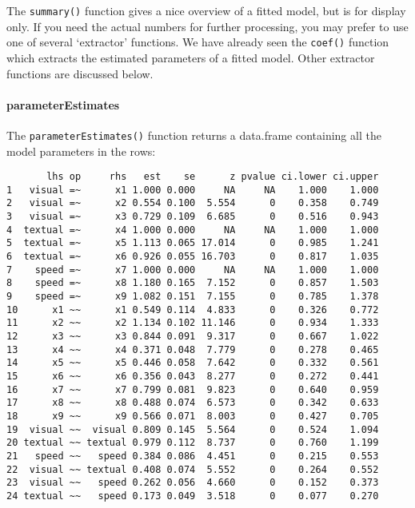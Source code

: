 The \texttt{summary()} function gives a nice overview of a fitted model,
but is for display only. If you need the actual numbers for further
processing, you may prefer to use one of several `extractor' functions.
We have already seen the \texttt{coef()} function which extracts the
estimated parameters of a fitted model. Other extractor functions are
discussed below.

\hypertarget{parameterestimates}{%
\paragraph{parameterEstimates}\label{parameterestimates}}

The \texttt{parameterEstimates()} function returns a data.frame
containing all the model parameters in the rows:

\begin{Shaded}
\begin{Highlighting}[]
\OtherTok{\textless{}{-}} 
\end{Highlighting}
\end{Shaded}

\begin{verbatim}
       lhs op     rhs   est    se      z pvalue ci.lower ci.upper
1   visual =~      x1 1.000 0.000     NA     NA    1.000    1.000
2   visual =~      x2 0.554 0.100  5.554      0    0.358    0.749
3   visual =~      x3 0.729 0.109  6.685      0    0.516    0.943
4  textual =~      x4 1.000 0.000     NA     NA    1.000    1.000
5  textual =~      x5 1.113 0.065 17.014      0    0.985    1.241
6  textual =~      x6 0.926 0.055 16.703      0    0.817    1.035
7    speed =~      x7 1.000 0.000     NA     NA    1.000    1.000
8    speed =~      x8 1.180 0.165  7.152      0    0.857    1.503
9    speed =~      x9 1.082 0.151  7.155      0    0.785    1.378
10      x1 ~~      x1 0.549 0.114  4.833      0    0.326    0.772
11      x2 ~~      x2 1.134 0.102 11.146      0    0.934    1.333
12      x3 ~~      x3 0.844 0.091  9.317      0    0.667    1.022
13      x4 ~~      x4 0.371 0.048  7.779      0    0.278    0.465
14      x5 ~~      x5 0.446 0.058  7.642      0    0.332    0.561
15      x6 ~~      x6 0.356 0.043  8.277      0    0.272    0.441
16      x7 ~~      x7 0.799 0.081  9.823      0    0.640    0.959
17      x8 ~~      x8 0.488 0.074  6.573      0    0.342    0.633
18      x9 ~~      x9 0.566 0.071  8.003      0    0.427    0.705
19  visual ~~  visual 0.809 0.145  5.564      0    0.524    1.094
20 textual ~~ textual 0.979 0.112  8.737      0    0.760    1.199
21   speed ~~   speed 0.384 0.086  4.451      0    0.215    0.553
22  visual ~~ textual 0.408 0.074  5.552      0    0.264    0.552
23  visual ~~   speed 0.262 0.056  4.660      0    0.152    0.373
24 textual ~~   speed 0.173 0.049  3.518      0    0.077    0.270
\end{verbatim}

